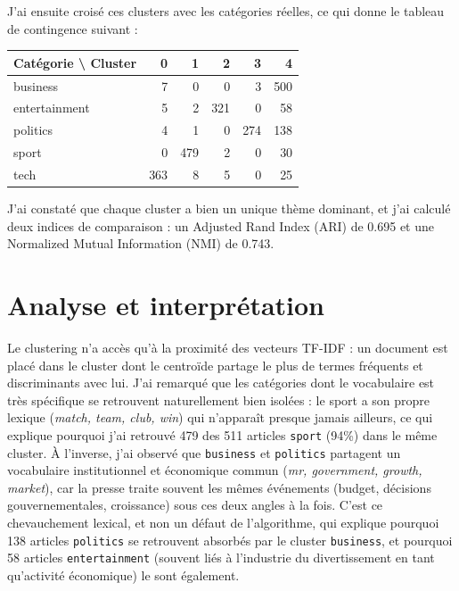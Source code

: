 \documentclass[11pt,a4paper]{article}
\begin{document}
J'ai ensuite croisé ces clusters avec les catégories réelles, ce qui donne
le tableau de contingence suivant :

\begin{table}[h]
\centering
\small
\begin{tabular}{lrrrrr}
\toprule
Catégorie \textbackslash{} Cluster & 0 & 1 & 2 & 3 & 4 \\
\midrule
business      &   7 &   0 &   0 &   3 & 500 \\
entertainment &   5 &   2 & 321 &   0 &  58 \\
politics      &   4 &   1 &   0 & 274 & 138 \\
sport         &   0 & 479 &   2 &   0 &  30 \\
tech          & 363 &   8 &   5 &   0 &  25 \\
\bottomrule
\end{tabular}
\end{table}

J'ai constaté que chaque cluster a bien un unique thème dominant, et j'ai
calculé deux indices de comparaison : un Adjusted Rand Index (ARI) de 0.695
et une Normalized Mutual Information (NMI) de 0.743.

\section{Analyse et interprétation}

Le clustering n'a accès qu'à la proximité des vecteurs TF-IDF : un document
est placé dans le cluster dont le centroïde partage le plus de termes
fréquents et discriminants avec lui. J'ai remarqué que les catégories dont
le vocabulaire est très spécifique se retrouvent naturellement bien
isolées : le sport a son propre lexique (\emph{match, team, club, win}) qui
n'apparaît presque jamais ailleurs, ce qui explique pourquoi j'ai retrouvé
479 des 511 articles \texttt{sport} (94\%) dans le même cluster. À
l'inverse, j'ai observé que \texttt{business} et \texttt{politics}
partagent un vocabulaire institutionnel et économique commun (\emph{mr,
government, growth, market}), car la presse traite souvent les mêmes
événements (budget, décisions gouvernementales, croissance) sous ces deux
angles à la fois. C'est ce chevauchement lexical, et non un défaut de
l'algorithme, qui explique pourquoi 138 articles \texttt{politics} se
retrouvent absorbés par le cluster \texttt{business}, et pourquoi 58
articles \texttt{entertainment} (souvent liés à l'industrie du
divertissement en tant qu'activité économique) le sont également.
\end{document}
